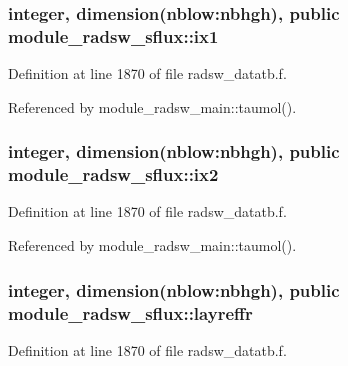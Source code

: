 \subsubsection[{\texorpdfstring{ix1}{ix1}}]{\setlength{\rightskip}{0pt plus 5cm}integer, dimension(nblow\+:nbhgh), public module\+\_\+radsw\+\_\+sflux\+::ix1}\hypertarget{namespacemodule__radsw__sflux_ac2864b4501e9bc3804d45d14f4aab472}{}\label{namespacemodule__radsw__sflux_ac2864b4501e9bc3804d45d14f4aab472}


Definition at line 1870 of file radsw\+\_\+datatb.\+f.



Referenced by module\+\_\+radsw\+\_\+main\+::taumol().

\subsubsection[{\texorpdfstring{ix2}{ix2}}]{\setlength{\rightskip}{0pt plus 5cm}integer, dimension(nblow\+:nbhgh), public module\+\_\+radsw\+\_\+sflux\+::ix2}\hypertarget{namespacemodule__radsw__sflux_a92703c3e826f7e81267c6b7ae31ebe42}{}\label{namespacemodule__radsw__sflux_a92703c3e826f7e81267c6b7ae31ebe42}


Definition at line 1870 of file radsw\+\_\+datatb.\+f.



Referenced by module\+\_\+radsw\+\_\+main\+::taumol().

\subsubsection[{\texorpdfstring{layreffr}{layreffr}}]{\setlength{\rightskip}{0pt plus 5cm}integer, dimension(nblow\+:nbhgh), public module\+\_\+radsw\+\_\+sflux\+::layreffr}\hypertarget{namespacemodule__radsw__sflux_a90c56da1bcadbea0b42e12487c1c1eec}{}\label{namespacemodule__radsw__sflux_a90c56da1bcadbea0b42e12487c1c1eec}


Definition at line 1870 of file radsw\+\_\+datatb.\+f.



